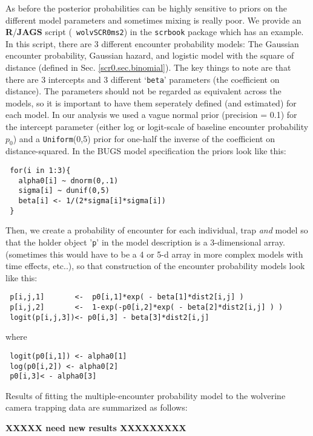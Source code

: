 As before the posterior probabilities can be highly sensitive to
priors on the different model parameters and sometimes mixing is
really poor.  We provide an {\bf R}/{\bf JAGS} script (\mbox{\tt
  wolvSCR0ms2}) in the \mbox{\tt scrbook} package which has an
example.  In this script, there are 3 different encounter probability
models:
The Gaussian encounter probability, Gaussian hazard, and logistic
model with the square of distance (defined in Sec. \ref{scr0.sec.binomial}). The key things to note are that
there are 3 intercepts and 3 different `\mbox{\tt beta}' parameters
(the coefficient on distance). The parameters should not be regarded
as equivalent across the models, so it is important to have them
seperately defined (and estimated) for each model.  In our analysis we
used a vague normal prior (precision = 0.1) for the intercept
parameter (either log or logit-scale of baseline encounter probability
$p_{0}$) and a \mbox{\tt Uniform}(0,5) prior for one-half the inverse of the
coefficient on distance-squared.
In the BUGS model specification the priors look like this:
\begin{verbatim}
 for(i in 1:3){
   alpha0[i] ~ dnorm(0,.1)
   sigma[i] ~ dunif(0,5)
   beta[i] <- 1/(2*sigma[i]*sigma[i])
 }
\end{verbatim}
Then,  we create a probability of encounter for each
individual, trap {\it and} model so that the holder object '\mbox{\tt p}' in the
model description is a 3-dimensional array. (sometimes this would have to be a 4
or 5-d array in more complex models with time effects, etc..), so that
construction of the encounter probability models look like this:
\begin{verbatim}
 p[i,j,1]       <-  p0[i,1]*exp( - beta[1]*dist2[i,j] )
 p[i,j,2]       <-  1-exp(-p0[i,2]*exp( - beta[2]*dist2[i,j] ) )
 logit(p[i,j,3])<- p0[i,3] - beta[3]*dist2[i,j]
\end{verbatim}
where
\begin{verbatim}
 logit(p0[i,1]) <- alpha0[1]
 log(p0[i,2]) <- alpha0[2]
 p0[i,3]< - alpha0[3]
\end{verbatim}
Results of fitting the multiple-encounter probability model to the
wolverine camera trapping data are summarized as follows:

{\bf XXXXX need new results XXXXXXXXX}








